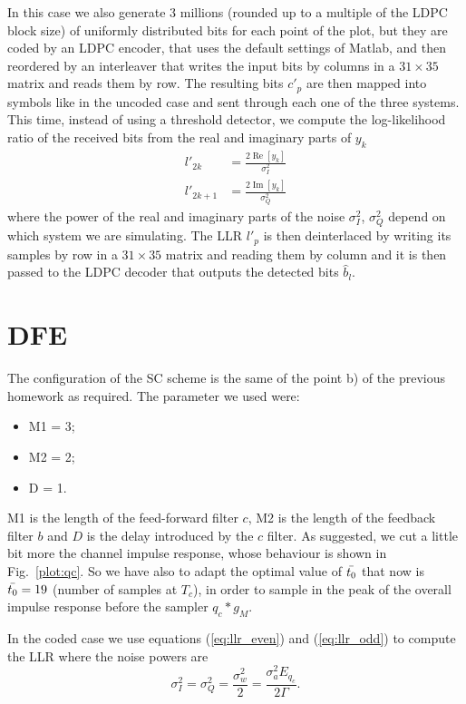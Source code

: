 \documentclass[a4paper,oneside]{article}
\renewcommand{\Re}[1]{\operatorname{Re}\left[#1\right]}
\renewcommand{\Im}[1]{\operatorname{Im}\left[#1\right]}
\begin{document}
In this case we also generate 3 millions (rounded up to a multiple of
the LDPC block size) of uniformly distributed bits for each point of
the plot, but they are coded by an LDPC encoder, that uses the default
settings of Matlab, and then reordered by an interleaver that writes
the input bits by columns in a $31\times35$ matrix and reads them by
row. The resulting bits $c'_p$ are then mapped into symbols like in
the uncoded case and sent through each one of the three systems.  This
time, instead of using a threshold detector, we compute the
log-likelihood ratio of the received bits from the real and imaginary
parts of $y_k$
\begin{align}
  l'_{2k} &= \frac{2\Re{y_k}}{\sigma^2_I}
  \label{eq:llr_even} \\
  l'_{2k+1} &= \frac{2\Im{y_k}}{\sigma^2_Q}
  \label{eq:llr_odd}
\end{align}
where the power of the real and imaginary parts of the noise
$\sigma^2_I$, $\sigma^2_Q$ depend on which system we are
simulating. The LLR $l'_p$ is then deinterlaced by writing its samples
by row in a $31\times35$ matrix and reading them by column and it is
then passed to the LDPC decoder that outputs the detected bits
$\hat{b}_l$.

\section{DFE}
\label{sec:dfe}
The configuration of the SC scheme is the same of the point b) of the previous homework as required. The parameter we used were:
\begin{itemize}
\item M1 = 3;
\item  M2 = 2;
\item D = 1.
\end{itemize}
M1 is the length of the feed-forward filter $c$, M2 is the length of the feedback filter $b$ and $D$ is the delay introduced by the $c$ filter.
As suggested, we cut a little bit more the channel impulse response, whose behaviour is shown in Fig.~\ref{plot:qc}. So we have also to adapt the optimal value of $\Bar{t_0}$ that now is $\Bar{t_0} = 19$ (number of samples at $T_c$), in order to sample in the peak of the overall impulse response before the sampler $q_c * g_M$.

In the coded case we use equations (\ref{eq:llr_even}) and
(\ref{eq:llr_odd}) to compute the LLR where the noise powers are
\begin{equation}
  \sigma^2_I = \sigma^2_Q = \frac{\sigma^2_w}{2} = \frac{\sigma^2_a E_{q_c}}{2\Gamma} .
\end{equation}
\end{document}
